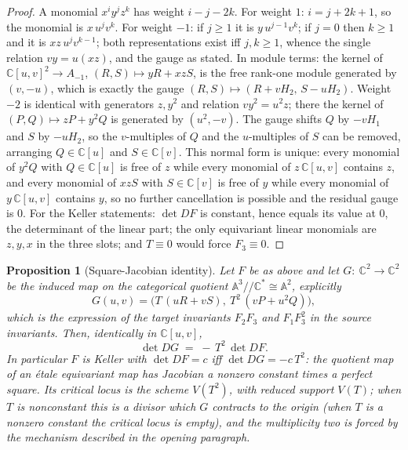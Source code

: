 \documentclass[11pt]{article}
\newtheorem{proposition}{Proposition}
\newcommand{\C}{\mathbb{C}}
\begin{document}
\begin{proof}
A monomial $x^iy^jz^k$ has weight $i-j-2k$. For weight $1$: $i=j+2k+1$, so the
monomial is $x\,u^jv^k$. For weight $-1$: if $j\ge1$ it is $y\,u^{j-1}v^k$; if
$j=0$ then $k\ge1$ and it is $xz\,u^{j}v^{k-1}$; both representations exist iff
$j,k\ge1$, whence the single relation $vy=u(xz)$, and the gauge as stated. In
module terms: the kernel of $\C[u,v]^{2}\to A_{-1}$, $(R,S)\mapsto yR+xzS$, is
the free rank-one module generated by $(v,-u)$, which is exactly the gauge
$(R,S)\mapsto(R+vH_2,\,S-uH_2)$. Weight
$-2$ is identical with generators $z,y^2$ and relation $vy^2=u^2z$; there the
kernel of $(P,Q)\mapsto zP+y^{2}Q$ is generated by $(u^{2},-v)$. The gauge
shifts $Q$ by $-vH_1$ and $S$ by $-uH_2$, so the $v$-multiples of $Q$ and the
$u$-multiples of $S$ can be removed, arranging $Q\in\C[u]$ and $S\in\C[v]$. This
normal form is unique: every monomial of $y^2Q$ with $Q\in\C[u]$ is free of $z$
while every monomial of $z\,\C[u,v]$ contains $z$, and every monomial of $xzS$
with $S\in\C[v]$ is free of $y$ while every monomial of $y\,\C[u,v]$ contains
$y$, so no further cancellation is possible and the residual gauge is $0$. For the Keller statements: $\det DF$ is constant, hence
equals its value at $0$, the determinant of the linear part; the only equivariant
linear monomials are $z,y,x$ in the three slots; and $T\equiv0$ would force
$F_3\equiv0$.
\end{proof}

\begin{proposition}[Square-Jacobian identity]
Let $F$ be as above and let $G:\ \C^2\to\C^2$ be the induced map on the
categorical quotient $\mathbb A^3/\!/\C^*\cong\mathbb A^2$, explicitly
\[
G(u,v)=\bigl(T\,(uR+vS),\ T^2\,(vP+u^2Q)\bigr),
\]
which is the expression of the target invariants $F_2F_3$ and $F_1F_3^2$ in the
source invariants. Then, identically in $\C[u,v]$,
\[
\det DG \;=\; -\,T^{2}\,\det DF .
\]
In particular $F$ is Keller with $\det DF=c$ iff\/ $\det DG=-c\,T^2$: the quotient
map of an \'etale equivariant map has Jacobian a nonzero constant times a perfect
square. Its critical locus is the scheme $V(T^{2})$, with reduced support $V(T)$;
when $T$ is nonconstant this is a divisor which $G$ contracts to the origin
(when $T$ is a nonzero constant the critical locus is empty), and the
multiplicity two is forced by the mechanism described in the opening paragraph.
\end{proposition}
\end{document}
